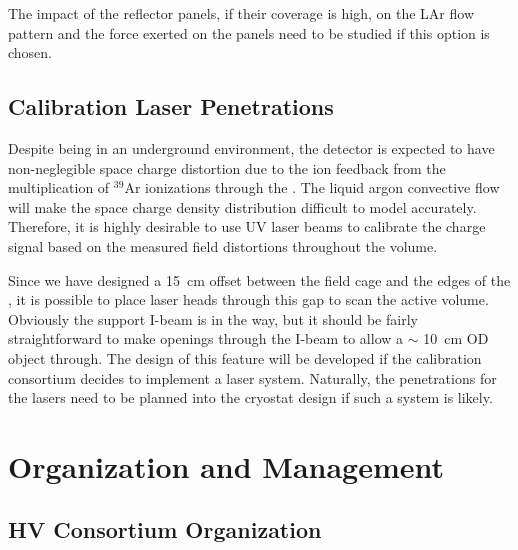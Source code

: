 The impact of the reflector panels, if their coverage is high, on the LAr flow pattern and the force exerted on the panels need to be studied if this option is chosen.

\subsection{Calibration Laser Penetrations}

Despite being in an underground environment, the \dual detector is expected to have non-neglegible space charge distortion due to the ion feedback from the multiplication of $^{39}$Ar ionizations through the . The liquid argon convective flow will make the space charge density distribution difficult to model accurately. Therefore, it is highly desirable to use UV laser beams to calibrate the charge signal based on the measured field distortions throughout the  volume.

Since we have designed a \SI{15}{\cm} offset between the field cage and the edges of the , it is possible to place laser heads through this gap to scan the  active volume. Obviously the  support I-beam is in the way, but it should be fairly straightforward to make openings through the I-beam to allow a $\sim $ \SI{10}{\cm} OD object through. The design of this feature will be developed if the calibration consortium decides to implement a laser system.  Naturally, the penetrations for the lasers need to be planned into the cryostat design if  such a system is likely.




\section{Organization and Management}
\label{sec:fddp-hv-org}

\subsection{HV Consortium Organization}
\label{sec:fddp-hv-org-consortium}

